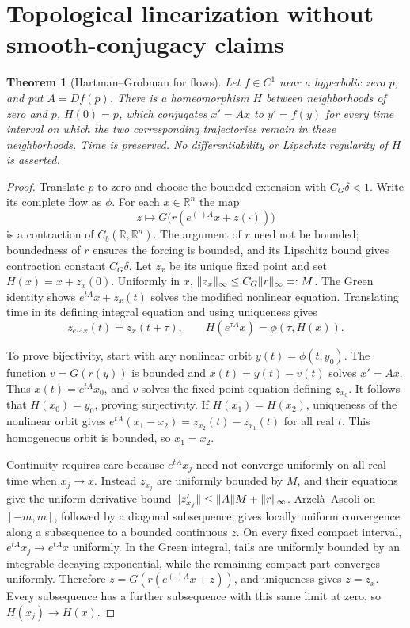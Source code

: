 \documentclass[11pt,oneside]{book}
\newtheorem{theorem}{Theorem}[chapter]
\theoremstyle{definition}
\theoremstyle{remark}\newtheorem{remark}[theorem]{Remark}
\newcommand{\R}{\mathbb R}\newcommand{\C}{\mathbb C}
\begin{document}
\section{Topological linearization without smooth-conjugacy claims}
\begin{theorem}[Hartman--Grobman for flows]\label{d13:20:hartman-grobman}
Let $f\in C^1$ near a hyperbolic zero $p$, and put $A=Df(p)$.
There is a homeomorphism $H$ between neighborhoods of zero and $p$,
$H(0)=p$, which conjugates $x'=Ax$ to $y'=f(y)$ for every time interval
on which the two corresponding trajectories remain in these
neighborhoods. Time is preserved. No differentiability or Lipschitz
regularity of $H$ is asserted.
\end{theorem}
\begin{proof}
Translate $p$ to zero and choose the bounded extension with
$C_G\delta<1$. Write its complete flow as $\phi$. For each $x\in\R^n$
the map
\[
 z\longmapsto G\bigl(r(e^{(\cdot)A}x+z(\cdot))\bigr)
\]
is a contraction of $C_b(\R,\R^n)$. The argument of $r$ need not be bounded;
boundedness of $r$ ensures the forcing is bounded, and its Lipschitz
bound gives contraction constant $C_G\delta$. Let $z_x$ be its unique
fixed point and set $H(x)=x+z_x(0)$. Uniformly in $x$,
$\lVert z_x\rVert_\infty\leq C_G\lVert r\rVert_\infty=:M$.
The Green identity shows
$e^{tA}x+z_x(t)$ solves the modified nonlinear equation. Translating time
in its defining integral equation and using uniqueness gives
\[
 z_{e^{\tau A}x}(t)=z_x(t+\tau),\qquad
 H(e^{\tau A}x)=\phi(\tau,H(x)).
\]

To prove bijectivity, start with any nonlinear orbit $y(t)=\phi(t,y_0)$.
The function $v=G(r(y))$ is bounded and $x(t)=y(t)-v(t)$ solves $x'=Ax$.
Thus $x(t)=e^{tA}x_0$, and $v$ solves the fixed-point equation defining
$z_{x_0}$. It follows that $H(x_0)=y_0$, proving surjectivity.
If $H(x_1)=H(x_2)$, uniqueness of the nonlinear orbit gives
$e^{tA}(x_1-x_2)=z_{x_2}(t)-z_{x_1}(t)$ for all real $t$.
This homogeneous orbit is bounded, so $x_1=x_2$.

Continuity requires care because $e^{tA}x_j$ need not converge uniformly
on all real time when $x_j\to x$. Instead $z_{x_j}$ are uniformly bounded
by $M$, and their equations give the uniform derivative bound
$\lVert z_{x_j}'\rVert\leq\lVert A\rVert M+\lVert r\rVert_\infty$. Arzel\`a--Ascoli on
$[-m,m]$, followed by a diagonal subsequence, gives locally uniform
convergence along a subsequence to a bounded continuous $z$. On every
fixed compact interval, $e^{tA}x_j\to e^{tA}x$ uniformly. In the Green
integral, tails are uniformly bounded by an integrable decaying
exponential, while the remaining compact part converges uniformly.
Therefore $z=G(r(e^{(\cdot)A}x+z))$, and uniqueness gives $z=z_x$.
Every subsequence has a further subsequence with this same limit at zero,
so $H(x_j)\to H(x)$.


\end{proof}
\end{document}
